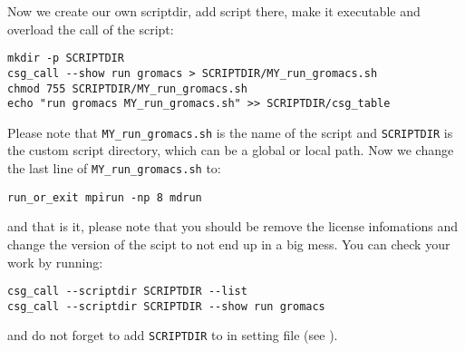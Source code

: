 Now we create our own scriptdir, add script there, make it executable and overload the call of the script:
\begin{verbatim}
mkdir -p SCRIPTDIR
csg_call --show run gromacs > SCRIPTDIR/MY_run_gromacs.sh
chmod 755 SCRIPTDIR/MY_run_gromacs.sh
echo "run gromacs MY_run_gromacs.sh" >> SCRIPTDIR/csg_table
\end{verbatim}
Please note that \texttt{MY\_run\_gromacs.sh} is the name of the script and \texttt{SCRIPTDIR} is the custom script directory, which can be a global or local path.
Now we change the last line of \texttt{MY\_run\_gromacs.sh} to:
\begin{verbatim}
run_or_exit mpirun -np 8 mdrun
\end{verbatim}
and that is it, please note that you should be remove the license infomations and change the version of the scipt to not end up in a big mess.
You can check your work by running:
\begin{verbatim}
csg_call --scriptdir SCRIPTDIR --list
csg_call --scriptdir SCRIPTDIR --show run gromacs
\end{verbatim}
and do not forget to add \texttt{SCRIPTDIR} to  in setting \xml file (see ).

